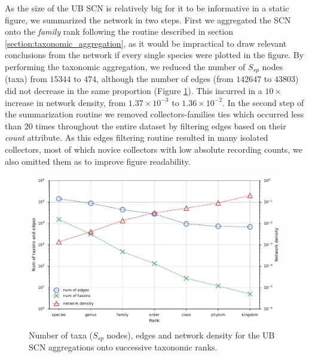 As the size of the UB SCN is relatively big for it to be informative in a static figure, we summarized the network in two steps.
First we aggregated the SCN onto the \textit{family} rank following the routine described in section \ref{section:taxonomic_aggregation}, as it would be impractical to draw relevant conclusions from the network if every single species were plotted in the figure.
By performing the taxonomic aggregation, we reduced the number of $S_{sp}$ nodes (taxa) from $15344$ to $474$, although the number of edges (from $142647$ to $43803$) did not decrease in the same proportion (Figure \ref{fig:ub_scn_tax_agg_curves}).
This incurred in a $10 \times$ increase in network density, from $1.37\times 10^{-3}$ to $1.36\times 10^{-2}$.
In the second step of the summarization routine we removed collectors-families ties which occurred less than $20$ times throughout the entire dataset by filtering edges based on their \textit{count} attribute.
As this edges filtering routine resulted in many isolated collectors, most of which novice collectors with low absolute recording counts, we also omitted them as to improve figure readability.

\begin{figure}[!ht]
  	\centering
    \includegraphics[width=\linewidth]{figures/casestudy_ub/scn_tax_agg_curves.pdf}
    \caption{ Number of taxa ($S_{sp}$ nodes), edges and network density for the UB SCN aggregations onto successive taxonomic ranks. }
    \label{fig:ub_scn_tax_agg_curves}
  \end{figure}

